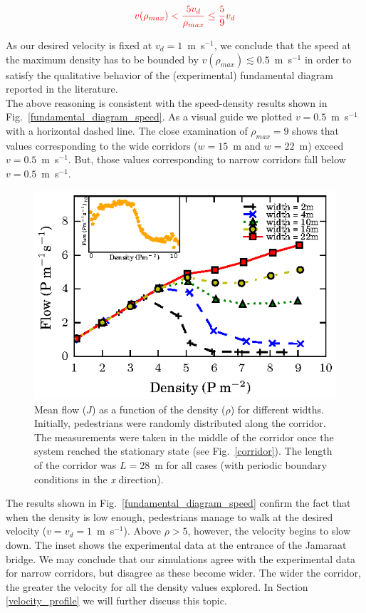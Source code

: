 \documentclass[preprint,12pt]{elsarticle}
\begin{document}
\begin{equation}
\textcolor{red}{v(\rho_{max}) < \frac{5v_d}{\rho_{max}} \leq \frac{5}{9} v_d}\\
\end{equation}

As our desired velocity is fixed at $v_d = 1$~m~s$^{-1}$, we conclude that the speed at 
the maximum density has to be bounded by $v(\rho_{max}) \lesssim  0.5$~m~s$^{-1}$ in 
order to satisfy the qualitative behavior of the (experimental) fundamental 
diagram reported in the literature.\\

The above reasoning is consistent with the speed-density results shown in Fig.~\ref{fundamental_diagram_speed}. As a visual guide we plotted $v=0.5$~m~s$^{-1}$ with a horizontal dashed line. The close examination of $\rho_{max} = 9$ shows that values corresponding to the wide corridors ($w=15$~m and $w=22$~m) exceed $v=0.5$~m~s$^{-1}$. But, those values corresponding to narrow corridors fall below $v=0.5$~m~s$^{-1}$. \\

\begin{figure}[htbp!]
\centering
\includegraphics[width=0.7\columnwidth]
{./flow-density_vd1_multiple_widths.eps}
\caption{\label{fundamental_diagram_flow} Mean flow ($J$) as a function of the 
density ($\rho$) for different widths. Initially, pedestrians were randomly 
distributed along the corridor. The measurements were taken in the middle
of the corridor once the system reached the stationary state (see Fig.~\ref{corridor}). The length of the corridor 
was $L=$28~m for all cases (with periodic boundary conditions in the \textit{x} direction).}
\end{figure}

The results shown in Fig.~\ref{fundamental_diagram_speed} confirm the fact that when the density is low enough, pedestrians manage to walk at the desired velocity ($v=v_d=1$~m~s$^{-1}$). Above $\rho>5$, however, the velocity begins to slow down. The inset shows the experimental data at the entrance of the Jamaraat bridge. We may conclude that our simulations agree with the experimental data for narrow corridors, but disagree as these become wider. The wider the corridor, the greater the velocity for all the density values explored. In Section \ref{velocity_profile} we will further discuss this topic.\\
\end{document}
